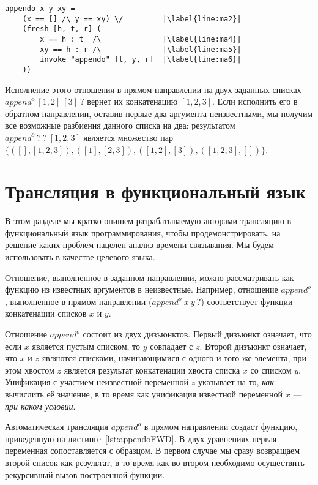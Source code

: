 \documentclass[conference,american,russian]{IEEEtran}
\begin{document}
\begin{lstlisting}[frame=single, escapechar=|]
appendo x y xy =
    (x == [] /\ y == xy) \/         |\label{line:ma2}|
    (fresh [h, t, r] (         
        x == h : t  /\              |\label{line:ma4}|
        xy == h : r /\              |\label{line:ma5}|
        invoke "appendo" [t, y, r]  |\label{line:ma6}|
    ))
\end{lstlisting}

Исполнение этого отношения в прямом направлении на двух заданных списках $append^o \ [1,2] \ [3] \ ?$ вернет их конкатенацию $[1,2,3]$.
Если исполнить его в обратном направлении, оставив первые два аргумента неизвестными, мы получим все возможные разбиения данного списка на два: результатом $append^o \ ? \ ? \ [1,2,3]$ является множество пар $\{([],[1,2,3]), ([1], [2,3]), ([1,2], [3]), ([1,2,3], [])\}$.

\section{Трансляция в функциональный язык}\label{translator}

В этом разделе мы кратко опишем разрабатываемую авторами трансляцию \miniKanren{} в функциональный язык программирования, чтобы продемонстрировать, на решение каких проблем нацелен анализ времени связывания.
Мы будем использовать \haskell{} в качестве целевого языка. 

Отношение, выполненное в заданном направлении, можно рассматривать как функцию из известных аргументов в неизвестные. 
Например, отношение $append^o$, выполненное в прямом направлении ($append^o \ x \ y \ ?$) соответствует функции конкатенации списков $x$ и $y$. 

Отношение $append^o$ состоит из двух дизъюнктов. 
Первый дизъюнкт означает, что если $x$ является пустым списком, то $y$ совпадает с $z$. 
Второй дизъюнкт означает, что $x$ и $z$ являются списками, начинающимися с одного и того же элемента, при этом хвостом $z$ является результат конкатенации хвоста списка $x$ со списком $y$. 
Унификация с участием неизвестной переменной $z$ указывает на то, \emph{как} вычислить её значение, в то время как унификация  известной переменной $x$ --- \emph{при каком условии}.

Автоматическая трансляция $append^o$ в прямом направлении создаст функцию, приведенную на листинге~\ref{lst:appendoFWD}. 
В двух уравнениях первая переменная сопоставляется с образцом. 
В первом случае мы сразу возвращаем второй список как результат, в то время как во втором необходимо осуществить рекурсивный вызов построенной функции. 
\end{document}
